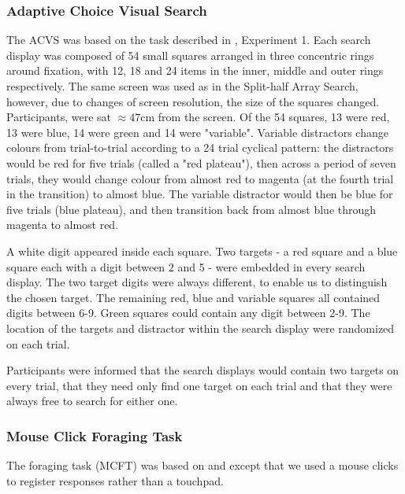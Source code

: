 \documentclass[]{rsos}%
\begin{document}
\subsubsection{Adaptive Choice Visual Search}

The ACVS was based on the task described in \cite{irons-leber2016}, Experiment 1. Each search display was composed of 54 small squares arranged in three concentric rings around fixation, with 12, 18 and 24 items in the inner, middle and outer rings respectively. The same screen was used as in the Split-half Array Search, however, due to changes of screen resolution, the size of the squares changed. Participants, were sat $\approx 47$cm from the screen. Of the 54 squares, 13 were red, 13 were blue, 14 were green and 14 were "variable". Variable distractors change colours from trial-to-trial according to a 24 trial cyclical pattern: the distractors would be red for five trials (called a "red plateau"), then across a period of seven trials, they would change colour from almost red to magenta (at the fourth trial in the transition) to almost blue. The variable distractor would then be blue for five trials (blue plateau), and then transition back from almost blue through magenta to almost red. 

A white digit appeared inside each square. Two targets - a red square and a blue square each with a digit between 2 and 5 - were embedded in every search display. The two target digits were always different, to enable us to distinguish the chosen target. The remaining red, blue and variable squares all contained digits between 6-9. Green squares could contain any digit between 2-9. The location of the targets and distractor within the search display were randomized on each trial.

Participants were informed that the search displays would contain two targets on every trial, that they need only find one target on each trial and that they were always free to search for either one.   

\subsubsection{Mouse Click Foraging Task}

The foraging task (MCFT) was based on \cite{kristjansson2014} and \cite{johannesson2016} except that we used a mouse clicks to register responses rather than a touchpad. 
\end{document}
